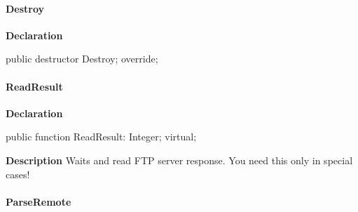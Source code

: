 \documentclass{report}
\newif\ifpdf
\begin{document}
\paragraph*{Destroy}\hspace*{\fill}

\label{ftpsend.TFTPSend-Destroy}
\begin{list}{}{
\setlength{\itemindent}{0cm}
\setlength{\listparindent}{0cm}
\setlength{\leftmargin}{\evensidemargin}
\addtolength{\leftmargin}{\tmplength}
\settowidth{\labelsep}{X}
\addtolength{\leftmargin}{\labelsep}
\setlength{\labelwidth}{\tmplength}
}
\item[\textbf{Declaration}\hfill]
\ifpdf
\begin{flushleft}
\fi
\begin{ttfamily}
public destructor Destroy; override;\end{ttfamily}

\ifpdf
\end{flushleft}
\fi

\end{list}
\paragraph*{ReadResult}\hspace*{\fill}

\label{ftpsend.TFTPSend-ReadResult}
\begin{list}{}{
\setlength{\itemindent}{0cm}
\setlength{\listparindent}{0cm}
\setlength{\leftmargin}{\evensidemargin}
\addtolength{\leftmargin}{\tmplength}
\settowidth{\labelsep}{X}
\addtolength{\leftmargin}{\labelsep}
\setlength{\labelwidth}{\tmplength}
}
\item[\textbf{Declaration}\hfill]
\ifpdf
\begin{flushleft}
\fi
\begin{ttfamily}
public function ReadResult: Integer; virtual;\end{ttfamily}

\ifpdf
\end{flushleft}
\fi

\par
\item[\textbf{Description}]
Waits and read FTP server response. You need this only in special cases!

\end{list}
\paragraph*{ParseRemote}\hspace*{\fill}
\end{document}
